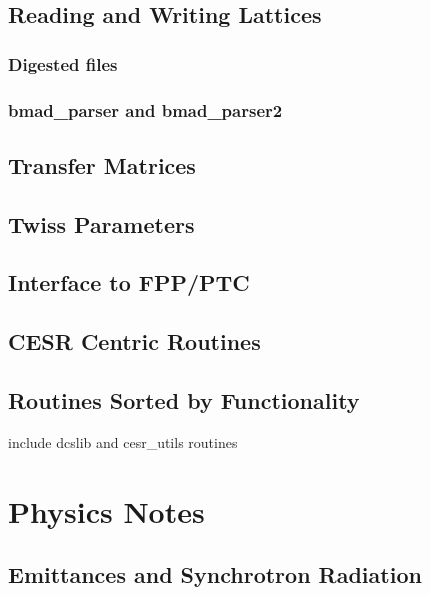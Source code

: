 \documentclass{book}
\begin{document}







\chapter{Reading and Writing Lattices}
\section{Digested files}
\section{bmad\_parser and bmad\_parser2}

\chapter{Transfer Matrices}
\chapter{Twiss Parameters}
\chapter{Interface to FPP/PTC}
\chapter{CESR Centric Routines}
\chapter{Routines Sorted by Functionality}

include dcslib and cesr\_utils routines

\part{Physics Notes}

\chapter{Emittances and Synchrotron Radiation}



\begin{theindex}


\end{theindex}
\end{document}
